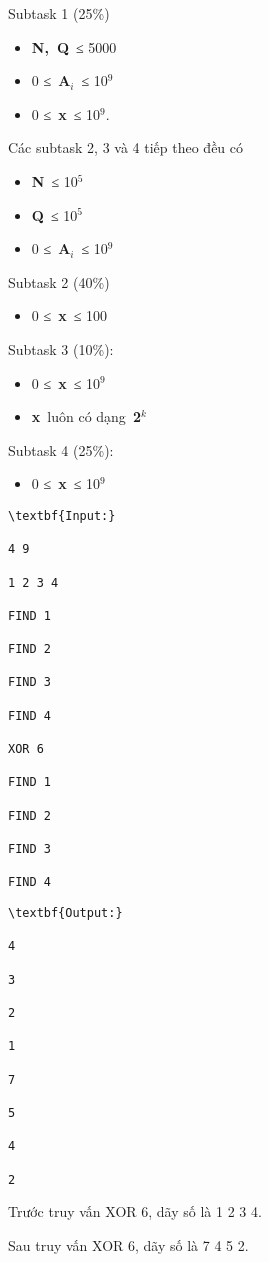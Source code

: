 Subtask 1 (25\%)
\begin{itemize}
	\item \textbf{N}\textbf{, }\textbf{Q} ≤ 5000
	\item 0 ≤ \textbf{A$_i$} ≤ 10$^9$
	\item 0 ≤ \textbf{x} ≤ 10$^9$.
\end{itemize}

Các subtask 2, 3 và 4 tiếp theo đều có
\begin{itemize}
	\item \textbf{N} ≤ 10$^5$
	\item \textbf{Q} ≤ 10$^5$
	\item 0 ≤ \textbf{A$_i$} ≤ 10$^9$
\end{itemize}

Subtask 2 (40\%)
\begin{itemize}
	\item 0 ≤ \textbf{x} ≤ 100
\end{itemize}

Subtask 3 (10\%):
\begin{itemize}
	\item 0 ≤ \textbf{x} ≤ 10$^9$
	\item \textbf{x} luôn có dạng \textbf{2$^k$}
\end{itemize}

Subtask 4 (25\%):
\begin{itemize}
	\item 0 ≤ \textbf{x} ≤ 10$^9$
\end{itemize}
\begin{verbatim}
\textbf{Input:}

4 9

1 2 3 4

FIND 1

FIND 2

FIND 3

FIND 4

XOR 6

FIND 1

FIND 2

FIND 3

FIND 4\end{verbatim}
\begin{verbatim}
\textbf{Output:}

4

3

2

1

7

5

4

2

\end{verbatim}
Trước truy vấn XOR 6, dãy số là 1 2 3 4.

Sau truy vấn XOR 6, dãy số là 7 4 5 2.
